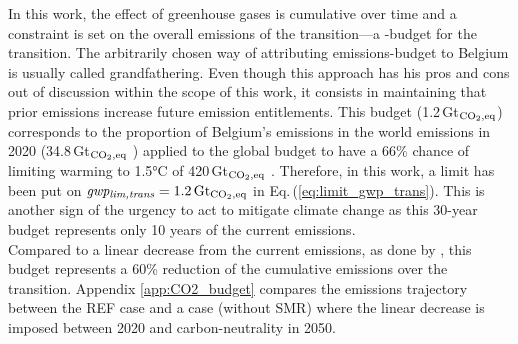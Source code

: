 In this work, the effect of greenhouse gases is cumulative over time and a constraint is set on the overall emissions of the transition---a -budget for the transition. The arbitrarily chosen way of attributing emissions-budget to Belgium is usually called \og grandfathering\fg. Even though this approach has his pros and cons out of discussion within the scope of this work, it consists in \og maintaining that prior emissions increase future emission entitlements\fg \cite{knight2013grandfathering}. This budget (1.2\,Gt$_{\ce{CO2},\text{eq}}$) corresponds to the proportion of Belgium's emissions in the world emissions in 2020 (34.8\,Gt$_{\ce{CO2},\text{eq}}$ \cite{ourworldindata_CO2_world}) applied to the global budget to have a 66\% chance of limiting warming to 1.5°C of 420\,Gt$_{\ce{CO2},\text{eq}}$ \cite{IPCC_CO2_budget}. Therefore, in this work, a limit has been put on $\emph{gwp\textsubscript{lim,trans}}=1.2\,\text{Gt}_{\ce{CO2},\text{eq}}$ in Eq.\,(\ref{eq:limit_gwp_trans}). This is another sign of the urgency to act to mitigate climate change as this 30-year budget represents only 10 years of the current emissions. \\

Compared to a linear decrease from the current emissions, as done by \citet{limpens2024pathway}, this budget represents a 60\% reduction of the cumulative emissions over the transition.  Appendix \ref{app:CO2_budget} compares the emissions trajectory between the REF case and a case (without \gls{SMR}) where the linear decrease is imposed between 2020 and carbon-neutrality in 2050.